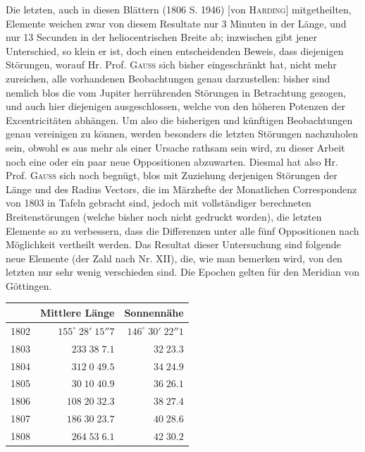 \par\indent Die letzten, auch in diesen Blättern (1806 S. 1946) [von \textsc{Harding}] mitgetheilten,
Elemente weichen zwar von diesem Resultate nur 3 Minuten in der Länge, und nur 13 Secunden in der
heliocentrischen Breite ab; inzwischen gibt jener Unterschied, so klein er ist, doch einen
entscheidenden Beweis, dass diejenigen Störungen, worauf Hr. Prof. \textsc{Gauss} sich bisher
eingeschränkt hat, nicht mehr zureichen, alle vorhandenen Beobachtungen genau darzustellen:
bisher sind nemlich blos die vom Jupiter herrührenden Störungen in Betrachtung gezogen, und auch
hier diejenigen ausgeschlossen, welche von den höheren Potenzen der Excentricitäten abhängen. Um
also die bisherigen und künftigen Beobachtungen genau vereinigen zu können, werden besonders die
letzten Störungen nachzuholen sein, obwohl es aus mehr als einer Ursache rathsam sein wird, zu
dieser Arbeit noch eine oder ein paar neue Oppositionen abzuwarten. Diesmal hat also Hr. Prof.
\textsc{Gauss} sich noch begnügt, blos mit Zuziehung derjenigen Störungen der Länge und des
Radius Vectors, die im Märzhefte der Monatlichen Correspondenz von 1803 in Tafeln gebracht sind,
jedoch mit vollständiger berechneten Breitenstörungen (welche bisher noch nicht gedruckt worden),
die letzten Elemente so zu verbessern, dass die Differenzen unter alle fünf Oppositionen nach
Möglichkeit vertheilt werden. Das Resultat dieser Untersuchung sind folgende neue Elemente (der
Zahl nach Nr. XII), die, wie man bemerken wird, von den letzten nur sehr wenig verschieden sind.
Die Epochen gelten für den Meridian von Göttingen.

\begin{center}\fontsize{10}{12}\selectfont\setlength{\tabcolsep}{3pt}\renewcommand{\arraystretch}{1.15}\begin{tabular}{lrr}
& Mittlere Länge & Sonnennähe\\\hline
1802 & $155^\circ\;28'\;15''7$ & $146^\circ\;30'\;22''1$\\
1803 & $233\;38\;7.1$ & $32\;23.3$\\
1804 & $312\;0\;49.5$ & $34\;24.9$\\
1805 & $30\;10\;40.9$ & $36\;26.1$\\
1806 & $108\;20\;32.3$ & $38\;27.4$\\
1807 & $186\;30\;23.7$ & $40\;28.6$\\
1808 & $264\;53\;6.1$ & $42\;30.2$\\
\end{tabular}\end{center}

